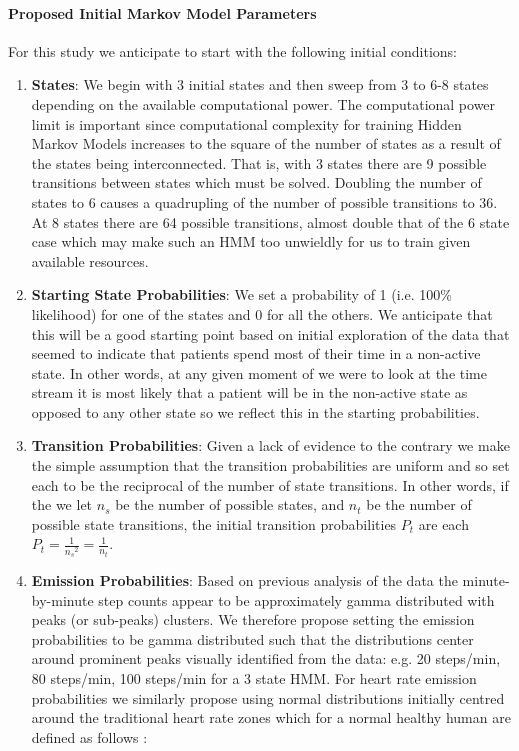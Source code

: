 \documentclass[]{article}
\begin{document}
\paragraph{Proposed Initial Markov Model Parameters}

For this study we anticipate to start with the following initial conditions:
\begin{enumerate}
	\item \textbf{States}: We begin with 3 initial states and then sweep from 3 to 6-8 states depending on the available computational power. The computational power limit is important since computational complexity for training Hidden Markov Models increases to the square of the number of states as a result of the states being interconnected. That is, with 3 states there are 9 possible transitions between states which must be solved. Doubling the number of states to 6 causes a quadrupling of the number of possible transitions to 36. At 8 states there are 64 possible transitions, almost double that of the 6 state case which may make such an HMM too unwieldly for us to train given available resources.
	\item \textbf{Starting State Probabilities}: We set a probability of 1 (i.e. 100\% likelihood) for one of the states and 0 for all the others. We anticipate that this will be a good starting point based on initial exploration of the data that seemed to indicate that patients spend most of their time in a non-active state. In other words, at any given moment of we were to look at the time stream it is most likely that a patient will be in the non-active state as opposed to any other state so we reflect this in the starting probabilities.
	\item \textbf{Transition Probabilities}: Given a lack of evidence to the contrary we make the simple assumption that the transition probabilities are uniform and so set each to be the reciprocal of the number of state transitions. In other words, if the we let $n_s$ be the number of possible states, and $n_t$ be the number of possible state transitions, the initial transition probabilities $P_t$ are each $P_t = \frac{1}{{n_s}^2} = \frac{1}{n_t}$.
	\item \textbf{Emission Probabilities}: Based on previous analysis of the data the minute-by-minute step counts appear to be approximately gamma distributed with peaks (or sub-peaks) clusters. We therefore propose setting the emission probabilities to be gamma distributed such that the distributions center around prominent peaks visually identified from the data: e.g. 20 steps/min, 80 steps/min, 100 steps/min for a 3 state HMM. For heart rate emission probabilities we similarly propose using normal distributions initially centred around the traditional heart rate zones which for a normal healthy human are defined as follows \cite{FitbitInc.2017}:

\end{enumerate}
\end{document}
